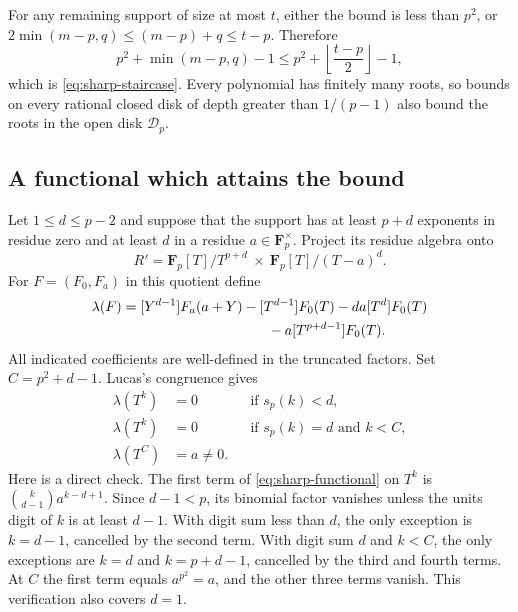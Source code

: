 For any remaining support of size at most $t$, either the bound is
less than $p^2$, or
$2\min(m-p,q)\le(m-p)+q\le t-p$.  Therefore
\[
 p^2+\min(m-p,q)-1
 \le p^2+\left\lfloor\frac{t-p}{2}\right\rfloor-1,
\]
which is \eqref{eq:sharp-staircase}.  Every polynomial has finitely many
roots, so bounds on every rational closed disk of depth greater than
$1/(p-1)$ also bound the roots in the open disk $\mathcal D_p$.

\subsection{A functional which attains the bound}

Let $1\le d\le p-2$ and suppose that the support has at least $p+d$
exponents in residue zero and at least $d$ in a residue
$a\in\mathbf F_p^\times$.  Project its residue algebra onto
\[
 R'=\mathbf F_p[T]/T^{p+d}\ \times\
                    \mathbf F_p[T]/(T-a)^d.
\]
For $F=(F_0,F_a)$ in this quotient define
\begin{equation}\label{eq:sharp-functional}
 \begin{split}
 \lambda(F)={}&[Y^{d-1}]F_a(a+Y)
       -[T^{d-1}]F_0(T)-da[T^d]F_0(T)\\
       &\hspace{32mm}-a[T^{p+d-1}]F_0(T).
 \end{split}
\end{equation}
All indicated coefficients are well-defined in the truncated factors.
Set $C=p^2+d-1$.  Lucas's congruence gives
\begin{equation}\label{eq:sharp-functional-values}
 \begin{aligned}
 \lambda(T^k)&=0&&\text{if }s_p(k)<d,\\
 \lambda(T^k)&=0&&\text{if }s_p(k)=d\text{ and }k<C,\\
 \lambda(T^C)&=a\ne0.&
 \end{aligned}
\end{equation}
Here is a direct check.  The first term of
\eqref{eq:sharp-functional} on $T^k$ is
$\binom{k}{d-1}a^{k-d+1}$.  Since $d-1<p$, its binomial factor
vanishes unless the units digit of $k$ is at least $d-1$.
With digit sum less than $d$, the only exception is $k=d-1$,
cancelled by the second term.  With digit sum $d$ and $k<C$, the
only exceptions are $k=d$ and $k=p+d-1$, cancelled by the third and
fourth terms.  At $C$ the first term equals $a^{p^2}=a$, and the
other three terms vanish.  This verification also covers $d=1$.

